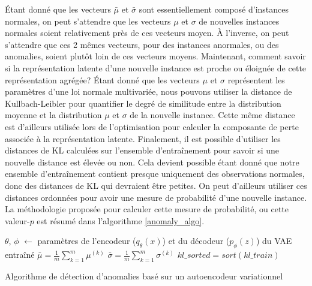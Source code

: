 Étant donné que les vecteurs $\bar{\mu}$ et $\bar{\sigma}$ sont essentiellement composé d'instances normales, on peut s'attendre que les vecteurs $\mu$ et $\sigma$ de nouvelles instances normales soient relativement près de ces vecteurs moyen. À l'inverse, on peut s'attendre que ces 2 mêmes vecteurs, pour des instances anormales, ou des anomalies, soient plutôt loin de ces vecteurs moyens. Maintenant, comment savoir si la représentation latente d'une nouvelle instance est proche ou éloignée de cette représentation agrégée? Étant donné que les vecteurs $\mu$ et $\sigma$ représentent les paramètres d'une loi normale multivariée, nous pouvons utiliser la distance de Kullbach-Leibler pour quantifier le degré de similitude entre la distribution moyenne et la distribution $\mu$ et $\sigma$ de la nouvelle instance. Cette même distance est d'ailleurs utilisée lors de l'optimisation pour calculer la composante de perte associée à la représentation latente. Finalement, il est possible d'utiliser les distances de KL calculées sur l'ensemble d'entraînement pour savoir si une nouvelle distance est élevée ou non. Cela devient possible étant donné que notre ensemble d'entraînement contient presque uniquement des observations normales, donc des distances de KL qui devraient être petites. On peut d'ailleurs utiliser ces distances ordonnées pour avoir une mesure de probabilité d'une nouvelle instance. La méthodologie proposée pour calculer cette mesure de probabilité, ou cette valeur-$p$ est résumé dans l'algorithme \ref{anomaly_algo}.
\newline


\begin{center}
	\begin{algorithm}[H] \label{anomaly_algo}
		\SetAlgoLined
		$\theta$, $\phi$ $\leftarrow$ paramètres de l'encodeur ($q_{\theta}(x)$) et du  décodeur ($p_{\phi}(z)$) du VAE entraîné\;
		$\bar{\mu} = \frac{1}{m} \sum_{k=1}^{m} \mu^{(k)}$\;
		$\bar{\sigma} = \frac{1}{m} \sum_{k=1}^{m} \sigma^{(k)}$\;
		$kl\_sorted = sort(kl\_train)$\;
		\caption{Algorithme de détection d'anomalies basé sur un autoencodeur variationnel}
	\end{algorithm}
\end{center}

